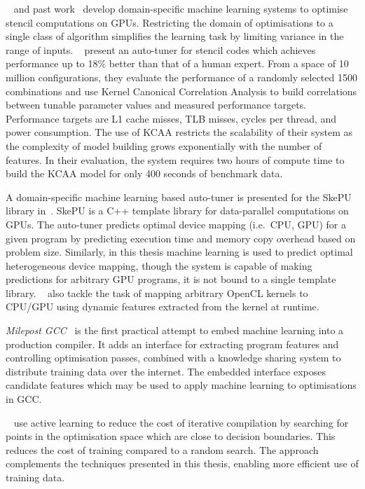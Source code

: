 \citeauthor{Lutz2013}~\cite{Lutz2013} and past work~\cite{Cummins2016a} develop domain-specific machine learning systems to optimise stencil computations on GPUs. Restricting the domain of optimisations to a single class of algorithm simplifies the learning task by limiting variance in the range of inputs. \citeauthor{Ganapathi2009}~\cite{Ganapathi2009} present an auto-tuner for stencil codes which achieves performance up to 18\% better than that of a human expert. From a space of 10 million configurations, they evaluate the performance of a randomly selected 1500 combinations and use Kernel Canonical Correlation Analysis to build correlations between tunable parameter values and measured performance targets. Performance targets are L1 cache misses, TLB misses, cycles per thread, and power consumption. The use of KCAA restricts the scalability of their system as the complexity of model building grows exponentially with the number of features. In their evaluation, the system requires two hours of compute time to build the KCAA model for only 400 seconds of benchmark data.

A domain-specific machine learning based auto-tuner is presented for the SkePU library in~\cite{Dastgeer2011b}. SkePU is a C++ template library for data-parallel computations on GPUs. The auto-tuner predicts optimal device mapping (i.e.\ CPU, GPU) for a given program by predicting execution time and memory copy overhead based on problem size. Similarly, in this thesis machine learning is used to predict optimal heterogeneous device mapping, though the system is capable of making predictions for arbitrary GPU programs, it is not bound to a single template library. \citeauthor{Moren2018}~\cite{Moren2018} also tackle the task of mapping arbitrary OpenCL kernels to CPU/GPU using dynamic features extracted from the kernel at runtime.

\emph{Milepost GCC}~\cite{Fursin2011} is the first practical attempt to embed machine learning into a production compiler. It adds an interface for extracting program features and controlling optimisation passes, combined with a knowledge sharing system to distribute training data over the internet. The embedded interface exposes candidate features which may be used to apply machine learning to optimisations in GCC.

\citeauthor{Ogilvie2017}~\cite{Ogilvie2017} use active learning to reduce the cost of iterative compilation by searching for points in the optimisation space which are close to decision boundaries. This reduces the cost of training compared to a random search. The approach complements the techniques presented in this thesis, enabling more efficient use of training data.

